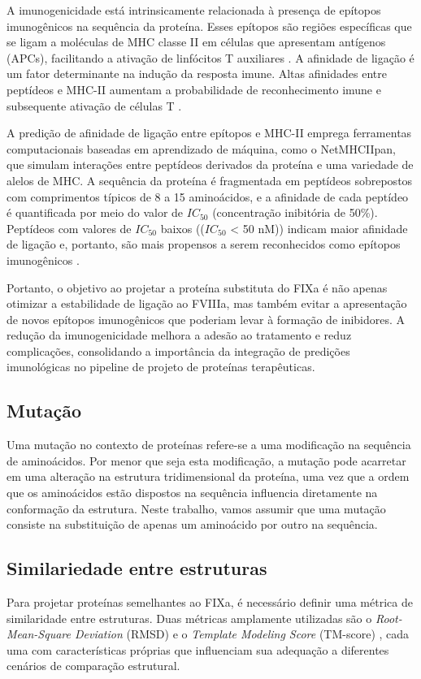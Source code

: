 A imunogenicidade está intrinsicamente relacionada à presença de epítopos imunogênicos na sequência da proteína. 
Esses epítopos são regiões específicas que se ligam a moléculas de MHC classe II em células que apresentam antígenos (APCs), 
facilitando a ativação de linfócitos T auxiliares \cite{Imuno}. 
A afinidade de ligação é um fator determinante na indução da resposta imune. 
Altas afinidades entre peptídeos e MHC-II aumentam a probabilidade de reconhecimento imune e subsequente ativação de células T \cite{Imuno}.

A predição de afinidade de ligação entre epítopos e MHC-II emprega ferramentas computacionais baseadas em aprendizado de máquina,
como o NetMHCIIpan, que simulam interações entre peptídeos derivados da proteína e uma variedade de alelos de MHC. 
A sequência da proteína é fragmentada em peptídeos sobrepostos com comprimentos típicos de 8 a 15 aminoácidos,
e a afinidade de cada peptídeo é quantificada por meio do valor de $IC_{50}$ (concentração inibitória de 50\%).
Peptídeos com valores de $IC_{50}$ baixos (($IC_{50}$ < 50 nM)) indicam maior afinidade de ligação e, portanto, 
são mais propensos a serem reconhecidos como epítopos imunogênicos \cite{Imuno}.

Portanto, o objetivo ao projetar a proteína substituta do FIXa é não apenas otimizar a estabilidade de ligação ao FVIIIa, 
mas também evitar a apresentação de novos epítopos imunogênicos que poderiam levar à formação de inibidores. 
A redução da imunogenicidade melhora a adesão ao tratamento e reduz complicações, 
consolidando a importância da integração de predições imunológicas no pipeline de projeto de proteínas terapêuticas.


\subsection{Mutação}
Uma mutação no contexto de proteínas refere-se a uma modificação na sequência de aminoácidos. 
Por menor que seja esta modificação, a mutação pode acarretar em uma alteração na estrutura tridimensional da proteína,
uma vez que a ordem que os aminoácidos estão dispostos na sequência influencia diretamente na conformação da estrutura. 
Neste trabalho, vamos assumir que uma mutação consiste na substituição de apenas um aminoácido por outro na sequência. 

\subsection{Similariedade entre estruturas}
\label{subsection:TMScore}  
Para projetar proteínas semelhantes ao FIXa, é necessário definir uma métrica de similaridade entre estruturas.
Duas métricas amplamente utilizadas são o \textit{Root-Mean-Square Deviation} (RMSD) 
e o \textit{Template Modeling Score} (TM-score) \cite{tmscore},
cada uma com características próprias que influenciam sua adequação a diferentes cenários de comparação estrutural.

